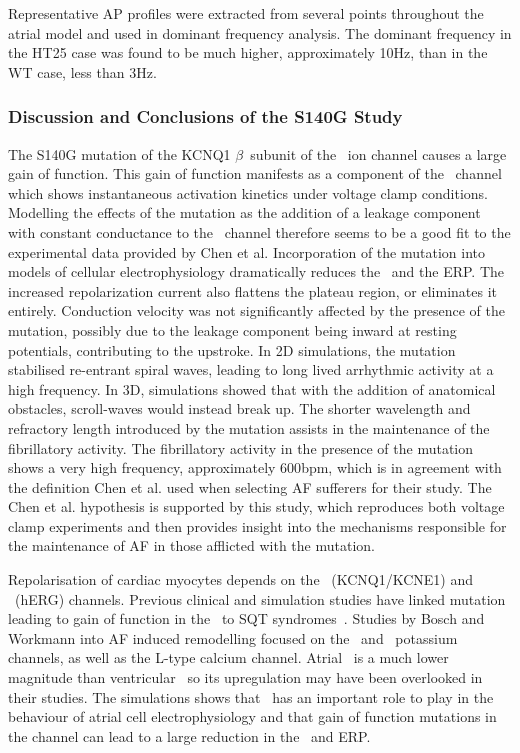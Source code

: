 Representative AP profiles were extracted from several points throughout the
atrial model and used in dominant frequency analysis.
The dominant frequency in the HT25 case was found to be much higher,
approximately \unit{10}{Hz}, than in the WT case, less than \unit{3}{Hz}.

\subsubsection{Discussion and Conclusions of the S140G Study}

The S140G mutation of the KCNQ1 $\beta$\ subunit of the \ ion channel
causes a large gain of function.
This gain of function manifests as a component of the \ channel which
shows instantaneous activation kinetics under voltage clamp conditions.
Modelling the effects of the mutation as the addition of a leakage component
with constant conductance to the \ channel therefore seems to be a good
fit to the experimental data provided by Chen et al.
Incorporation of the mutation into models of cellular electrophysiology
dramatically reduces the \apd\ and the ERP.
The increased repolarization current also flattens the plateau region, or
eliminates it entirely.
Conduction velocity was not significantly affected by the presence of the
mutation, possibly due to the leakage component being inward at resting
potentials, contributing to the upstroke.
In 2D simulations, the mutation stabilised re-entrant spiral waves, leading to
long lived arrhythmic activity at a high frequency.
In 3D, simulations showed that with the addition of anatomical obstacles,
scroll-waves would instead break up.
The shorter wavelength and refractory length introduced by the mutation assists
in the maintenance of the fibrillatory activity.
The fibrillatory activity in the presence of the mutation shows a very high
frequency, approximately \unit{600}{bpm}, which is in agreement with the
definition Chen et al. used when selecting AF sufferers for their study.
The Chen et al. hypothesis is supported by this study, which reproduces both
voltage clamp experiments and then provides insight into the mechanisms
responsible for the maintenance of AF in those afflicted with the mutation.

Repolarisation of cardiac myocytes depends on the \ (KCNQ1/KCNE1) and
\ (hERG) channels.
Previous clinical and simulation studies have linked mutation leading to
gain of function in the \ to SQT syndromes~\cite{Brugada2004,Hong2005}.
Studies by Bosch and Workmann into AF induced remodelling focused on the
\ and \ potassium channels, as well as the L-type calcium channel.
Atrial \ is a much lower magnitude than ventricular \ so its
upregulation may have been overlooked in their studies.
The simulations shows that \ has an important role to play in the behaviour
of atrial cell electrophysiology and that gain of function mutations in the
channel can lead to a large reduction in the \apd\ and ERP.

